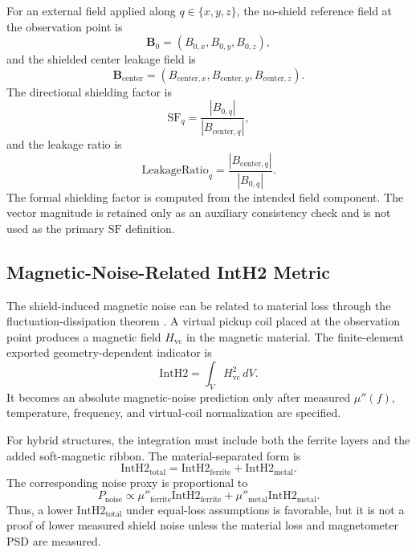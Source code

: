 \documentclass[letterpaper,journal]{IEEEtran}
\begin{document}
For an external field applied along $q\in\{x,y,z\}$, the no-shield reference field at the observation point is
\begin{equation}
\mathbf{B}_0=(B_{0,x},B_{0,y},B_{0,z}),
\label{eq:b0}
\end{equation}
and the shielded center leakage field is
\begin{equation}
\mathbf{B}_{\mathrm{center}}=(B_{\mathrm{center},x},B_{\mathrm{center},y},B_{\mathrm{center},z}).
\label{eq:bcenter}
\end{equation}
The directional shielding factor is
\begin{equation}
\mathrm{SF}_q=\frac{|B_{0,q}|}{|B_{\mathrm{center},q}|},
\label{eq:sfq}
\end{equation}
and the leakage ratio is
\begin{equation}
\mathrm{LeakageRatio}_q=\frac{|B_{\mathrm{center},q}|}{|B_{0,q}|}.
\label{eq:leakage}
\end{equation}
The formal shielding factor is computed from the intended field component. The vector magnitude is retained only as an auxiliary consistency check and is not used as the primary $\mathrm{SF}$ definition.

\subsection{Magnetic-Noise-Related IntH2 Metric}

The shield-induced magnetic noise can be related to material loss through the fluctuation-dissipation theorem \cite{ref9,ref18}. A virtual pickup coil placed at the observation point produces a magnetic field $H_{\mathrm{vc}}$ in the magnetic material. The finite-element exported geometry-dependent indicator is
\begin{equation}
\mathrm{IntH2}=\int_V H_{\mathrm{vc}}^2\,dV.
\label{eq:inth2}
\end{equation}
It becomes an absolute magnetic-noise prediction only after measured $\mu''(f)$, temperature, frequency, and virtual-coil normalization are specified.

For hybrid structures, the integration must include both the ferrite layers and the added soft-magnetic ribbon. The material-separated form is
\begin{equation}
\mathrm{IntH2}_{\mathrm{total}}
=
\mathrm{IntH2}_{\mathrm{ferrite}}
+
\mathrm{IntH2}_{\mathrm{metal}} .
\label{eq:inth2sep}
\end{equation}
The corresponding noise proxy is proportional to
\begin{equation}
P_{\mathrm{noise}}
\propto
\mu''_{\mathrm{ferrite}}\mathrm{IntH2}_{\mathrm{ferrite}}
+
\mu''_{\mathrm{metal}}\mathrm{IntH2}_{\mathrm{metal}} .
\label{eq:noiseproxy}
\end{equation}
Thus, a lower $\mathrm{IntH2}_{\mathrm{total}}$ under equal-loss assumptions is favorable, but it is not a proof of lower measured shield noise unless the material loss and magnetometer PSD are measured.
\end{document}
